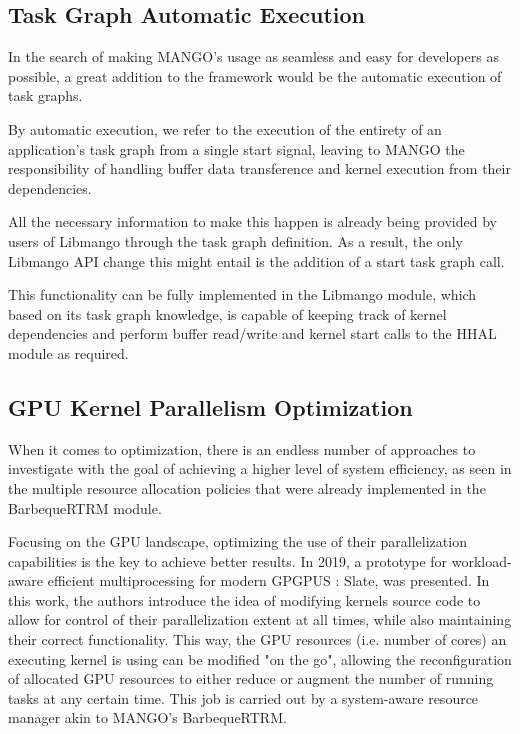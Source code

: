 \subsection{Task Graph Automatic Execution}

In the search of making MANGO's usage as seamless and easy for developers as possible, a great addition to the framework would be the automatic execution of task graphs. 

By automatic execution, we refer to the execution of the entirety of an application's task graph from a single start signal, leaving to MANGO the responsibility of handling buffer data transference and kernel execution from their dependencies.

All the necessary information to make this happen is already being provided by users of Libmango through the task graph definition. As a result, the only Libmango API change this might entail is the addition of a start task graph call.

This functionality can be fully implemented in the Libmango module, which based on its task graph knowledge, is capable of keeping track of kernel dependencies and perform buffer read/write and kernel start calls to the HHAL module as required.

\subsection{GPU Kernel Parallelism Optimization}

When it comes to optimization, there is an endless number of approaches to investigate with the goal of achieving a higher level of system efficiency, as seen in the multiple resource allocation policies that were already implemented in the BarbequeRTRM module.

Focusing on the GPU landscape, optimizing the use of their parallelization capabilities is the key to achieve better results. In 2019, a prototype for workload-aware efficient multiprocessing for modern GPGPUS \cite{slate}: Slate, was presented.
In this work, the authors introduce the idea of modifying kernels source code to allow for control of their parallelization extent at all times, while also maintaining their correct functionality. This way, the GPU resources (i.e. number of cores) an executing kernel is using can be modified "on the go", allowing the reconfiguration of allocated GPU resources to either reduce or augment the number of running tasks at any certain time. This job is carried out by a system-aware resource manager akin to MANGO's BarbequeRTRM.

